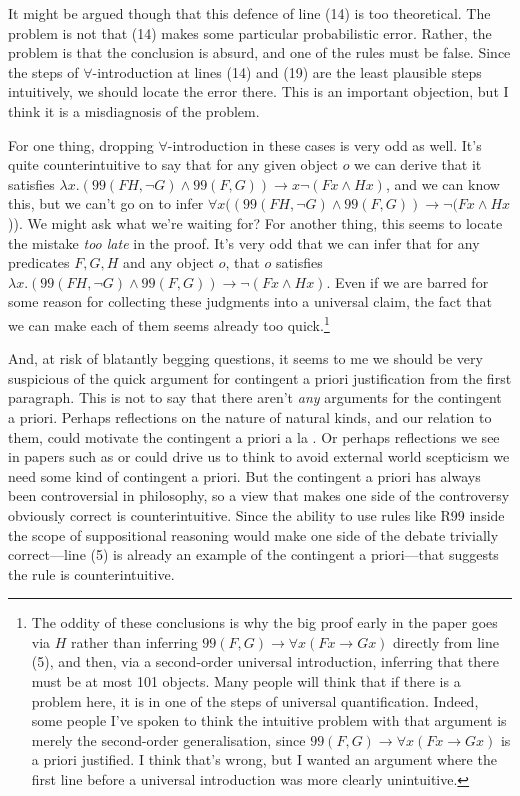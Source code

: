 It might be argued though that this defence of line (14) is too theoretical. The problem is not that (14) makes some particular probabilistic error. Rather, the problem is that the conclusion is absurd, and one of the rules must be false. Since the steps of $\forall$-introduction at lines (14) and (19) are the least plausible steps intuitively, we should locate the error there. This is an important objection, but I think it is a misdiagnosis of the problem.

For one thing, dropping $\forall$-introduction in these cases is very odd as well. It's quite counterintuitive to say that for any given object $o$ we can derive that it satisfies $\lambda x.(99(FH, \neg G) \wedge 99(F, G)) \rightarrow x \neg(Fx \wedge Hx)$, and we can know this, but we can't go on to infer $\forall x ((99(FH, \neg G) \wedge 99(F, G)) \rightarrow \neg(Fx \wedge Hx$)). We might ask what we're waiting for? For another thing, this seems to locate the mistake \textit{too late} in the proof. It's very odd that we can infer that for any predicates $F, G, H$ and any object $o$, that $o$ satisfies $\lambda x.(99(FH, \neg G) \wedge 99(F, G)) \rightarrow \neg(Fx \wedge Hx)$. Even if we are barred for some reason for collecting these judgments into a universal claim, the fact that we can make each of them seems already too quick.\footnote{The oddity of these conclusions is why the big proof early in the paper goes via $H$ rather than inferring $99(F, G) \rightarrow \forall x (Fx \rightarrow Gx)$ directly from line (5), and then, via a second-order universal introduction, inferring that there must be at most 101 objects. Many people will think that if there is a problem here, it is in one of the steps of universal quantification. Indeed, some people I've spoken to think the intuitive problem with that argument is merely the second-order generalisation, since $99(F, G) \rightarrow \forall x (Fx \rightarrow Gx)$ is a priori justified. I think that's wrong, but I wanted an argument where the first line before a universal introduction was more clearly unintuitive.}

And, at risk of blatantly begging questions, it seems to me we should be very suspicious of the quick argument for contingent a priori justification from the first paragraph. This is not to say that there aren't \textit{any} arguments for the contingent a priori. Perhaps reflections on the nature of natural kinds, and our relation to them, could motivate the contingent a priori a la \citet{Kripke1980}. Or perhaps reflections we see in papers such as \citet{Wright2004} or \citet{White2006} could drive us to think to avoid external world scepticism we need some kind of contingent a priori. But the contingent a priori has always been controversial in philosophy, so a view that makes one side of the controversy obviously correct is counterintuitive. Since the ability to use rules like R99 inside the scope of suppositional reasoning would make one side of the debate trivially correct---line (5) is already an example of the contingent a priori---that suggests the rule is counterintuitive.

